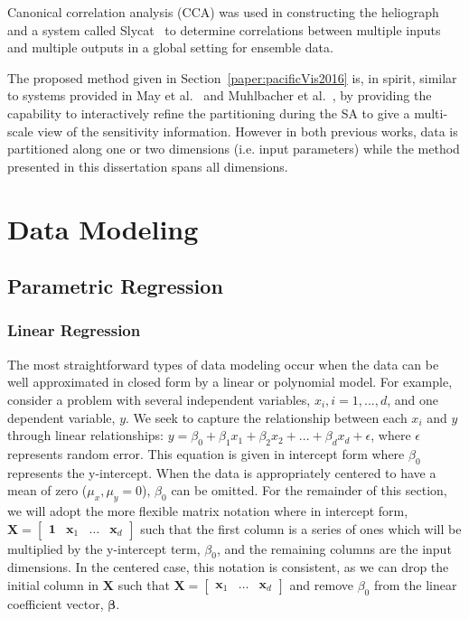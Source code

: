 Canonical correlation analysis (CCA) was used in constructing the heliograph~\cite{DeganiShaftoOlson2006} and a system called Slycat~\cite{CrossnoSheadSielicki2015} to determine correlations between multiple inputs and multiple outputs in a global setting for ensemble data.

The proposed method given in Section~\ref{paper:pacificVis2016} is, in spirit, similar to systems provided in May et al.~\cite{MayBannachDavey2011} and Muhlbacher et al.~\cite{MuhlbacherPiringer2013}, by providing the capability to interactively refine the partitioning during the SA to give a multi-scale view of the sensitivity information.
%
However in both previous works, data is partitioned along one or two dimensions (i.e. input parameters) while the method presented in this dissertation spans all dimensions.

\section{Data Modeling}
\label{sec:regression}
\subsection{Parametric Regression}
\subsubsection{Linear Regression}
The most straightforward types of data modeling occur when the data can be well approximated in closed form by a linear or polynomial model.
%
For example, consider a problem with several independent variables, $x_i, i=1,...,d$, and one dependent variable, $y$.
%
We seek to capture the relationship between each $x_i$ and $y$ through linear relationships: $y = \beta_0 + \beta_1 x_1 + \beta_2 x_2 + ... + \beta_d x_d + \epsilon$, where $\epsilon$ represents random error.
%
This equation is given in intercept form where $\beta_0$ represents the y-intercept.
%
When the data is appropriately centered to have a mean of zero ($\mu_x,\mu_y = 0$), $\beta_0$ can be omitted.
%
For the remainder of this section, we will adopt the more flexible matrix notation where in intercept form, $\mathbf{X} = \begin{bmatrix}\mathbf{1} & \mathbf{x}_1 & \ldots & \mathbf{x}_d \end{bmatrix}$ such that the first column is a series of ones which will be multiplied by the y-intercept term, $\beta_0$, and the remaining columns are the input dimensions.
%
In the centered case, this notation is consistent, as we can drop the initial column in $\mathbf{X}$ such that $\mathbf{X} = \begin{bmatrix}\mathbf{x}_1 & \ldots & \mathbf{x}_d\end{bmatrix}$ and remove $\beta_0$ from the linear coefficient vector, $\boldsymbol\beta$.

